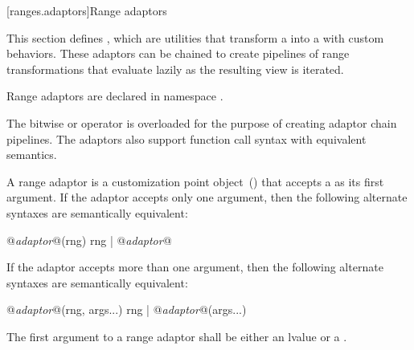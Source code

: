 [ranges.adaptors]{Range adaptors}

\pnum
This section defines , which are utilities that transform a 
into a  with custom behaviors. These adaptors can be chained to create pipelines of
range transformations that evaluate lazily as the resulting view is iterated.

\pnum
Range adaptors are declared in namespace .

\pnum
The bitwise or operator is overloaded for the purpose of creating adaptor chain pipelines. The
adaptors also support function call syntax with equivalent semantics.

\pnum
A range adaptor is a customization point object~() that accepts a  as its
first argument. If the adaptor accepts only one argument, then the following alternate syntaxes
are semantically equivalent:

\begin{codeblock}
@\textit{adaptor}@(rng)
rng | @\textit{adaptor}@
\end{codeblock}

If the adaptor accepts more than one argument, then the following alternate syntaxes are
semantically equivalent:

\begin{codeblock}
@\textit{adaptor}@(rng, args...)
rng | @\textit{adaptor}@(args...)
\end{codeblock}

\pnum
The first argument to a range adaptor shall be either an lvalue  or a .

\pnum
\enterexample
{}
\exitexample
